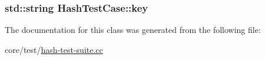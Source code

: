 \subsubsection[{\texorpdfstring{key}{key}}]{\setlength{\rightskip}{0pt plus 5cm}std\+::string Hash\+Test\+Case\+::key\hspace{0.3cm}{\ttfamily [protected]}}\hypertarget{classHashTestCase_a955e1a4f01ad2ae6474e52e3bd403069}{}\label{classHashTestCase_a955e1a4f01ad2ae6474e52e3bd403069}


The documentation for this class was generated from the following file\+:\begin{DoxyCompactItemize}
\item 
core/test/\hyperlink{hash-test-suite_8cc}{hash-\/test-\/suite.\+cc}\end{DoxyCompactItemize}
